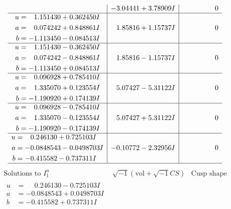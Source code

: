 \documentclass[1p]{elsarticle_modified}
\theoremstyle{definition}
\newcommand{\I}{\sqrt{-1}}
\begin{document}
$$\begin{array}{c|c|c}
 & -3.04441 + 3.78909 I & \phantom{-0.000000 } 0 \\ \hline\begin{aligned}
u &= \phantom{-}1.151430 + 0.362450 I \\
a &= \phantom{-}0.074242 + 0.848861 I \\
b &= -1.113450 - 0.084513 I\end{aligned}
 & \phantom{-}1.85816 + 1.15737 I & \phantom{-0.000000 } 0 \\ \hline\begin{aligned}
u &= \phantom{-}1.151430 - 0.362450 I \\
a &= \phantom{-}0.074242 - 0.848861 I \\
b &= -1.113450 + 0.084513 I\end{aligned}
 & \phantom{-}1.85816 - 1.15737 I & \phantom{-0.000000 } 0 \\ \hline\begin{aligned}
u &= \phantom{-}0.096928 + 0.785410 I \\
a &= \phantom{-}1.335070 + 0.123554 I \\
b &= -1.190920 + 0.174139 I\end{aligned}
 & \phantom{-}5.07427 - 5.31122 I & \phantom{-0.000000 } 0 \\ \hline\begin{aligned}
u &= \phantom{-}0.096928 - 0.785410 I \\
a &= \phantom{-}1.335070 - 0.123554 I \\
b &= -1.190920 - 0.174139 I\end{aligned}
 & \phantom{-}5.07427 + 5.31122 I & \phantom{-0.000000 } 0 \\ \hline\begin{aligned}
u &= \phantom{-}0.246130 + 0.725103 I \\
a &= -0.0848543 - 0.0498703 I \\
b &= -0.415582 - 0.737311 I\end{aligned}
 & -0.10772 - 2.32956 I & \phantom{-0.000000 } 0\\
 \hline 
 \end{array}$$\newpage$$\begin{array}{c|c|c}  
\text{Solutions to }I^u_{1}& \I (\text{vol} + \sqrt{-1}CS) & \text{Cusp shape}\\
 \hline 
\begin{aligned}
u &= \phantom{-}0.246130 - 0.725103 I \\
a &= -0.0848543 + 0.0498703 I \\
b &= -0.415582 + 0.737311 I\end{aligned}

\end{array}$$
\end{document}
